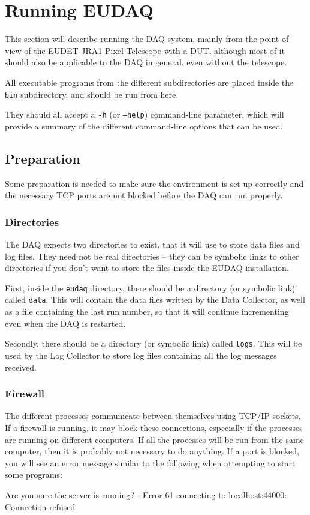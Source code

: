 \section{Running EUDAQ}
This section will describe running the DAQ system, mainly from the point of view of the
EUDET JRA1 Pixel Telescope\cite{eudet2009} with a \gls{DUT}, although most of it should
also be applicable to the DAQ in general, even without the telescope.

All executable programs from the different subdirectories are placed inside the \texttt{bin} subdirectory,
and should be run from here.

They should all accept a \texttt{-h} (or \texttt{--help}) command-line parameter,
which will provide a summary of the different command-line options that can be used.

\subsection{Preparation}
Some preparation is needed to make sure the environment is set up correctly and
the necessary TCP ports are not blocked before the DAQ can run properly.

\subsubsection{Directories}
The DAQ expects two directories to exist, that it will use to store data files and log files.
They need not be real directories -- they can be symbolic links to other directories
if you don't want to store the files inside the EUDAQ installation.

First, inside the \texttt{eudaq} directory, there should be a directory (or symbolic link) called \texttt{data}.
This will contain the data files written by the Data Collector, as well as a file containing the last run number,
so that it will continue incrementing even when the DAQ is restarted.

Secondly, there should be a directory (or symbolic link) called \texttt{logs}.
This will be used by the Log Collector to store log files containing all the log messages received.

\subsubsection{Firewall}
The different processes communicate between themselves using TCP/IP sockets.
If a firewall is running, it may block these connections,
especially if the processes are running on different computers.
If all the processes will be run from the same computer,
then it is probably not necessary to do anything.
If a port is blocked, you will see an error message similar to the following
when attempting to start some programs:
\begin{listing}[]
Are you sure the server is running? - Error 61 connecting to localhost:44000: Connection refused
\end{listing}

